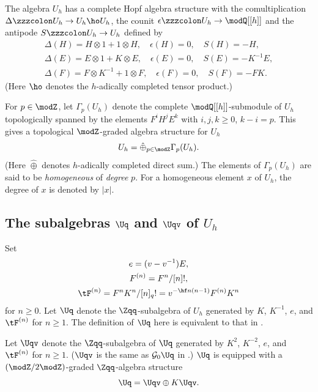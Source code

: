 \documentclass{amsart}
\numberwithin{equation}{section}
\numberwithin{figure}{section}
\theoremstyle{plain}
\theoremstyle{definition}
\theoremstyle{remark}
\begin{document}
The algebra $U_h$ has a complete Hopf algebra structure with the
comultiplication $\Delta \zzzcolon U_h\rightarrow U_h\ho U_h$, the counit $\epsilon \zzzcolon U_h\rightarrow \modQ [[h]]$
and the antipode $S\zzzcolon U_h\rightarrow U_h$ defined by
\begin{gather*}
    \Delta (H)=H\otimes 1+1\otimes H,\quad\epsilon (H)=0,\quad S(H)=-H,\\
    \Delta (E)=E\otimes 1+K\otimes E,\quad\epsilon (E)=0,\quad S(E)=-K^{-1}E,\\
    \Delta (F)=F\otimes K^{-1}+1\otimes F,\quad\epsilon (F)=0,\quad S(F)=-FK.
\end{gather*}
(Here $\ho$ denotes the $h$-adically completed tensor product.)

For $p\in \modZ $, let $\Gamma _p(U_h)$ denote the complete $\modQ [[h]]$-submodule
of $U_h$ topologically spanned by the elements $F^iH^jE^k$ with
$i,j,k\ge 0$, $k-i=p$.  This gives a topological $\modZ $-graded algebra
structure for $U_h$
\begin{equation*}
  U_h = \hat\oplus_{p\in \modZ }\Gamma _p(U_h).
\end{equation*}
(Here $\hat\oplus$ denotes $h$-adically completed direct sum.)  The
elements of $\Gamma _p(U_h)$ are said to be {\em homogeneous} of {\em
degree} $p$.  For a homogeneous element $x$ of $U_h$, the degree of
$x$ is denoted by $|x|$.

\subsection{The subalgebras $\Uq$ and $\Uqv$ of $U_h$}
\label{sec:subalgebras-uq-uqv}
Set
\begin{gather*}
  e= (v-v^{-1})E,\\
  F^{(n)} = F^n/[n]!,\\
  \tF^{(n)} = F^nK^n/[n]_q! = v^{-\hf n(n-1)}F^{(n)}K^n
\end{gather*}
for $n\ge 0$.  Let $\Uq$ denote the $\Zqq$-subalgebra of $U_h$ generated
by $K$, $K^{-1}$, $e$, and $\tF^{(n)}$ for $n\ge 1$.
The definition of $\Uq$ here is equivalent to that in \cite[Section
11]{H:uqsl2}.

Let $\Uqv$ denote the $\Zqq$-subalgebra of $\Uq$ generated by $K^2$,
$K^{-2}$, $e$, and $\tF^{(n)}$ for $n\ge 1$.  ($\Uqv$ is the same as
${\mathcal G}_0\Uq$ in \cite{H:uqsl2}.)  $\Uq$ is equipped with a
$(\modZ /2\modZ )$-graded $\Zqq$-algebra structure
\begin{equation}
  \label{eq:56}
  \Uq= \Uqv \oplus K\Uqv.
\end{equation}
\end{document}
